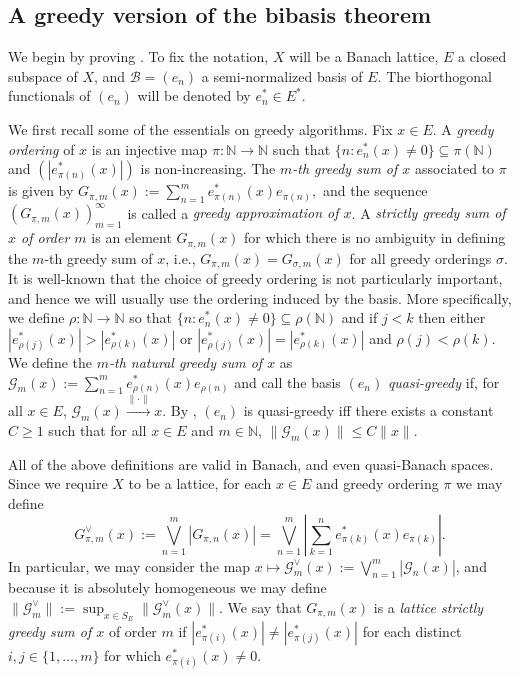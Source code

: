 \documentclass[12pt,leqno]{amsart}
\numberwithin{equation}{section}
\theoremstyle{definition}
\def\N{{\mathbb N}}
\begin{document}
\subsection{A greedy version of the bibasis theorem}\label{Sub1}
We begin by proving . To fix the notation, $X$ will be a Banach lattice, $E$ a closed subspace of $X$, and $\mathcal{B}=(e_n)$ a semi-normalized basis of $E$. The biorthogonal functionals of $(e_n)$ will be denoted by $e_n^*\in E^*$. 
\medskip


We first recall some of the essentials on greedy algorithms. Fix $x\in E$. A \emph{greedy ordering} of $x$ is an injective map $\pi : \mathbb{N}\to \mathbb{N}$ such that $\{n: e_n^*(x)\neq 0\}\subseteq \pi(\mathbb{N})$ and  $(|e^*_{\pi(n)}(x)|)$ is non-increasing. The \emph{$m$-th greedy sum of $x$} associated to $\pi$ is given by $G_{\pi,m}(x):=\sum_{n=1}^m e^*_{\pi(n)}(x)e_{\pi(n)},$
and the sequence $(G_{\pi,m}(x))_{m=1}^\infty$ is called a \emph{greedy approximation of $x$}.  A  \emph{strictly greedy sum of $x$ of order $m$} is an element  $G_{\pi,m}(x)$ for which  there is no ambiguity in defining the $m$-th greedy sum of $x$, i.e., $G_{\pi,m}(x)=G_{\sigma,m}(x)$ for all  greedy orderings $\sigma$.
It is well-known that the choice of greedy ordering is not particularly important, and hence we will usually use the ordering induced by the basis.  More specifically, we define  $\rho: \mathbb{N}\to \mathbb{N}$ so that $\{n: e_n^*(x)\neq 0\}\subseteq \rho(\mathbb{N})$ and if $j<k$ then either $|e_{\rho(j)}^*(x)|>|e_{\rho(k)}^*(x)|$ or $|e^*_{\rho(j)}(x)|=|e_{\rho(k)}^*(x)|$ and $\rho(j)<\rho(k)$. We define the \emph{$m$-th  natural greedy sum of $x$} as $\mathcal{G}_m(x):=\sum_{n=1}^me_{\rho(n)}^*(x)e_{\rho(n)}$ and call the basis $(e_n)$  \emph{quasi-greedy} if, for all $x\in E$, $\mathcal{G}_m(x)\xrightarrow{\|\cdot\|}x$. By , $(e_n)$ is quasi-greedy iff there exists a constant  $C\geq 1$ such that for all $x\in E$ and $m\in \mathbb{N}$,
$\|\mathcal{G}_m(x)\|\leq C\|x\|.$
\medskip





All of the above definitions are valid in Banach, and even quasi-Banach spaces. Since we require $X$ to be a lattice, for each $x\in E$ and greedy ordering $\pi$ we may define $$G_{\pi,m}^\vee(x):=\bigvee_{n=1}^m\left|G_{\pi,n}(x)\right|=\bigvee_{n=1}^m\left|\sum_{k=1}^n  e_{\pi(k)}^*(x)e_{\pi(k)}\right|.$$ In particular, we may consider the map $x\mapsto\mathcal{G}^\vee_m(x):=\bigvee_{n=1}^m|\mathcal{G}_n(x)|$, and because it is absolutely homogeneous  we may define
$\|\mathcal{G}^\vee_m\|:=\sup_{x\in S_E}\|\mathcal{G}^\vee_m(x)\|.$ We say that $G_{\pi,m}(x)$ is a \emph{lattice strictly greedy sum of $x$} of order $m$ if $|e^*_{\pi(i)}(x)|\neq |e^*_{\pi(j)}(x)|$ for each distinct $i,j\in \{1,\dots,m\}$ for which $e^*_{\pi(i)}(x)\neq 0$.
\medskip
\end{document}
